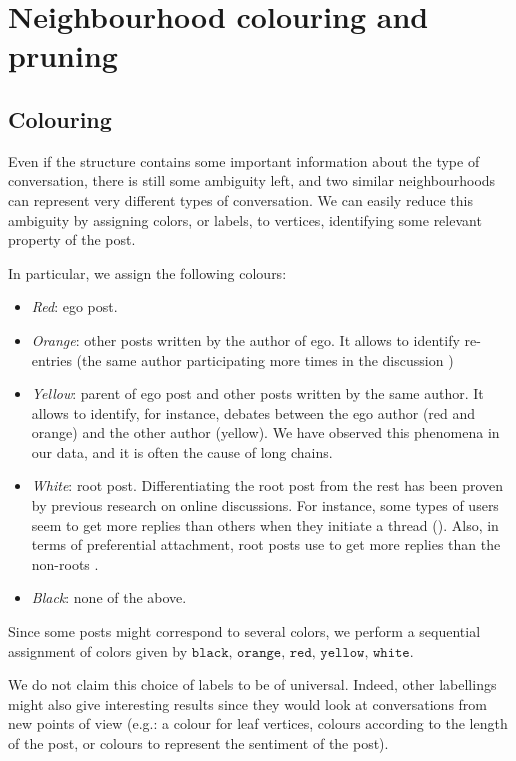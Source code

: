 \documentclass[conference]{IEEEtran}
\begin{document}
\section{Neighbourhood colouring and pruning}\label{sec:colouring_pruning}
\subsection{Colouring}
Even if the structure contains some important information about the type of conversation, there is still some ambiguity left, and two similar neighbourhoods can represent very different types of conversation. We can easily reduce this ambiguity by assigning colors, or labels, to vertices, identifying some relevant property of the post. 

In particular, we assign the following colours:

\begin{itemize}
\item \textit{Red}: ego post.
\item \textit{Orange}: other posts written by the author of ego. It allows to identify re-entries (the same author participating more times in the discussion \cite{Backstrom2013})
\item \textit{Yellow}: parent of ego post and other posts written by the same author. It allows to identify, for instance, debates between the ego author (red and orange) and the other author (yellow). We have observed this phenomena in our data, and it is often the cause of long chains.
\item \textit{White}: root post. Differentiating the root post from the rest has been proven by previous research on online discussions. For instance, some types of users seem to get more replies than others when they initiate a thread (\cite{Himelboim2009,  Lumbreras2013}). Also, in terms of preferential attachment, root posts use to get more replies than the non-roots \cite{Gomez2010, Gomez2012}.
\item \textit{Black}: none of the above.
\end{itemize}
Since some posts might correspond to several colors, we perform a sequential assignment of colors given by $\texttt{black, orange, red, yellow, white}$. 

We do not claim this choice of labels to be of universal. Indeed, other labellings might also give interesting results since they would look at conversations from new points of view (e.g.: a colour for leaf vertices, colours according to the length of the post, or colours to represent the sentiment of the post). 
\end{document}
